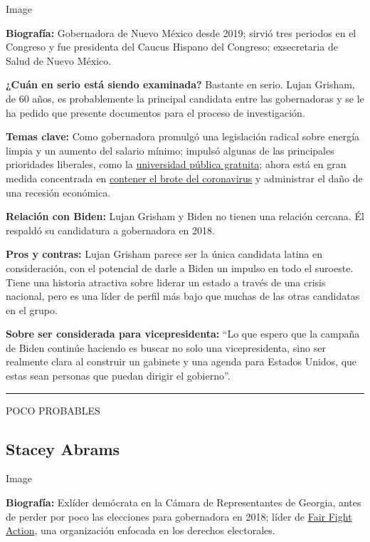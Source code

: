 Image

\textbf{Biografía:} Gobernadora de Nuevo México desde 2019; sirvió tres
periodos en el Congreso y fue presidenta del Caucus Hispano del
Congreso; exsecretaria de Salud de Nuevo México.

\textbf{¿Cuán en serio está siendo examinada?} Bastante en serio. Lujan
Grisham, de 60 años, es probablemente la principal candidata entre las
gobernadoras y se le ha pedido que presente documentos para el proceso
de investigación.

\textbf{Temas clave:} Como gobernadora promulgó una legislación radical
sobre energía limpia y un aumento del salario mínimo; impulsó algunas de
las principales prioridades liberales, como la
\href{https://www.nytimes3xbfgragh.onion/2019/09/18/us/new-mexico-free-college-tuition.html}{universidad
pública gratuita}; ahora está en gran medida concentrada en
\href{https://www.nytimes3xbfgragh.onion/2020/04/24/us/coronavirus-new-mexico.html}{contener
el brote del coronavirus} y administrar el daño de una recesión
económica.

\textbf{Relación con Biden:} Lujan Grisham y Biden no tienen una
relación cercana. Él respaldó su candidatura a gobernadora en 2018.

\textbf{Pros y contras:} Lujan Grisham parece ser la única candidata
latina en consideración, con el potencial de darle a Biden un impulso en
todo el suroeste. Tiene una historia atractiva sobre liderar un estado a
través de una crisis nacional, pero es una líder de perfil más bajo que
muchas de las otras candidatas en el grupo.

\textbf{Sobre ser considerada para vicepresidenta:} ``Lo que espero que
la campaña de Biden continúe haciendo es buscar no solo una
vicepresidenta, sino ser realmente clara al construir un gabinete y una
agenda para Estados Unidos, que estas sean personas que puedan dirigir
el gobierno''.

\begin{center}\rule{0.5\linewidth}{\linethickness}\end{center}

POCO PROBABLES

\hypertarget{stacey-abrams}{%
\subsection{Stacey Abrams}\label{stacey-abrams}}

Image

\textbf{Biografía:} Exlíder demócrata en la Cámara de Representantes de
Georgia, antes de perder por poco las elecciones para gobernadora en
2018; líder de
\href{https://www.nytimes3xbfgragh.onion/2019/08/13/us/politics/stacey-abrams-fair-fight-2020.html}{Fair
Fight Action}, una organización enfocada en los derechos electorales.

